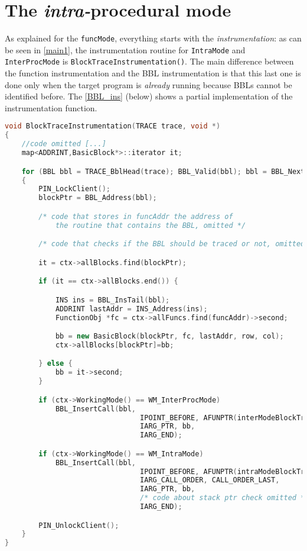 \documentclass[a4paper,10pt]{report}
\begin{document}
\section{The \emph{intra-}procedural mode}

As explained for the \verb|funcMode|, everything starts with the \emph{instrumentation}:
as can be seen in \cref{main1}, the instrumentation routine for \verb|IntraMode| and \verb|InterProcMode| is \verb|BlockTraceInstrumentation()|. The main difference between the
function instrumentation and the BBL instrumentation is that this last one is done
only when the target program is \emph{already} running because BBLs cannot be
identified before. The \cref{BBL_ins} (below) shows a partial implementation of the instrumentation function.


\begin{lstlisting}[language=C++,
	caption={partial implementation of \texttt{BlockTraceInstrumentation()}},
	label=BBL_ins, frame=leftline, showstringspaces=false]
void BlockTraceInstrumentation(TRACE trace, void *)
{
	//code omitted [...]
	map<ADDRINT,BasicBlock*>::iterator it;

    for (BBL bbl = TRACE_BblHead(trace); BBL_Valid(bbl); bbl = BBL_Next(bbl))
    {
		PIN_LockClient();
 		blockPtr = BBL_Address(bbl);

		/* code that stores in funcAddr the address of
			the routine that contains the BBL, omitted */

		/* code that checks if the BBL should be traced or not, omitted */

		it = ctx->allBlocks.find(blockPtr);

		if (it == ctx->allBlocks.end()) {

			INS ins = BBL_InsTail(bbl);
			ADDRINT lastAddr = INS_Address(ins);
			FunctionObj *fc = ctx->allFuncs.find(funcAddr)->second;

			bb = new BasicBlock(blockPtr, fc, lastAddr, row, col);
			ctx->allBlocks[blockPtr]=bb;

		} else {
			bb = it->second;
		}

		if (ctx->WorkingMode() == WM_InterProcMode)
			BBL_InsertCall(bbl,
								IPOINT_BEFORE, AFUNPTR(interModeBlockTrace),
								IARG_PTR, bb,
								IARG_END);

		if (ctx->WorkingMode() == WM_IntraMode)
			BBL_InsertCall(bbl,
								IPOINT_BEFORE, AFUNPTR(intraModeBlockTrace),
								IARG_CALL_ORDER, CALL_ORDER_LAST,
								IARG_PTR, bb,
								/* code about stack ptr check omitted */
								IARG_END);

		PIN_UnlockClient();
    }
}

\end{lstlisting}
\end{document}
